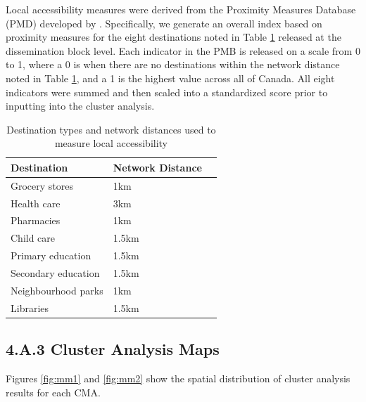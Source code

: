 Local accessibility measures were derived from the Proximity Measures Database (PMD) developed by . Specifically, we generate an overall index based on proximity measures for the eight destinations noted in Table \ref{table:pmd} released at the dissemination block level. Each indicator in the PMB is released on a scale from 0 to 1, where a 0 is when there are no destinations within the network distance noted in Table \ref{table:pmd}, and a 1 is the highest value across all of Canada. All eight indicators were summed and then scaled into a standardized score prior to inputting into the cluster analysis.

\begin{table}[h]
	\small
	\centering
	\caption{{Destination types and network distances used to measure local accessibility}}
	\label{table:pmd}
	\begin{tabular}{lll}
		\hline
		\textbf{Destination}    & \textbf{Network Distance}   \\ \hline
		Grocery stores & 1km \\
		Health care & 3km \\
		Pharmacies & 1km \\
		Child care & 1.5km \\
		Primary education & 1.5km \\
		Secondary education & 1.5km \\
		Neighbourhood parks & 1km \\
		Libraries & 1.5km \\ 
		\hline
	\end{tabular}
\end{table}

\newpage



\subsection*{4.A.3 \hspace{2mm} Cluster Analysis Maps}

Figures \ref{fig:mm1} and \ref{fig:mm2} show the spatial distribution of cluster analysis results for each CMA.


